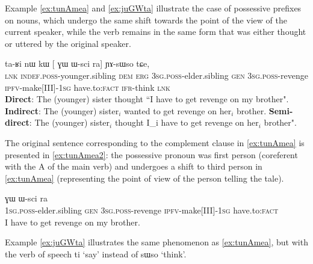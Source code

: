 \documentclass[oldfontcommands,oneside,a4paper,11pt]{article}
\newcommand{\ipa}[1]{{\phon \mbox{#1}}} %
\newcommand{\bleu}[1]{{\color{blue}#1}}
\newcommand{\rouge}[1]{{\color{red}#1}}
\begin{document}
Example \ref{ex:tunAmea} and \ref{ex:juGWta} illustrate the case of possessive prefixes on nouns, which undergo the same shift towards the point of the view of the current speaker, while the verb remains in the same form that was either thought or uttered by the original speaker.

\begin{exe}
\ex \label{ex:tunAmea}
\gll  \ipa{tɕe}  	\ipa{ta-ʁi}  	\ipa{nɯ}  	\ipa{kɯ}  	[\rouge{\ipa{ɯ-pi}}  	\ipa{ɣɯ}  	\ipa{ɯ-sci}  	\bleu{\ipa{tu-nɤme-a}}  	\ipa{ra}] 	\ipa{ɲɤ-sɯso}  	\ipa{tɕe,}  	\\
\textsc{lnk}  \textsc{indef.poss}-younger.sibling \textsc{dem} \textsc{erg}  {\textsc{3sg.poss}-elder.sibling}  \textsc{gen} \textsc{3sg.poss}-revenge {\textsc{ipfv}-make[III]-\textsc{1sg}} have.to:\textsc{fact} \textsc{ifr}-think \textsc{lnk} \\
\glt  \textbf{Direct}: The (younger) sister thought ``\bleu{I have to get revenge} on {my brother}".
\glt  \textbf{Indirect}:  The (younger) sister$_i$ \rouge{wanted to get revenge on her$_i$ brother}.
\glt  \textbf{Semi-direct}:  The (younger) sister$_i$ thought \bleu{I_i have to get revenge} on \rouge{her$_i$ brother}".
  \end{exe}
  
The original sentence corresponding to the complement clause in \ref{ex:tunAmea} is presented in \ref{ex:tunAmea2}: the possessive pronoun was first person (coreferent with the A of the main verb) and undergoes a shift to third person in \ref{ex:tunAmea} (representing the point of view of the person telling the tale).
  \begin{exe}
\ex \label{ex:tunAmea2}
\gll \bleu{\ipa{a-pi}}  	\ipa{ɣɯ}  	\ipa{ɯ-sci}  	\bleu{\ipa{tu-nɤme-a}}  	\ipa{ra}	\\
 {\textsc{1sg.poss}-elder.sibling}  \textsc{gen} \textsc{3sg.poss}-revenge {\textsc{ipfv}-make[III]-\textsc{1sg}} have.to:\textsc{fact}  \\
\glt  I have to get revenge on my brother.
  \end{exe}
  
  Example \ref{ex:juGWta} illustrates the same phenomenon as \ref{ex:tunAmea}, but with the verb of speech \ipa{ti} `say' instead of \ipa{sɯso} `think'.
 
\end{document}
